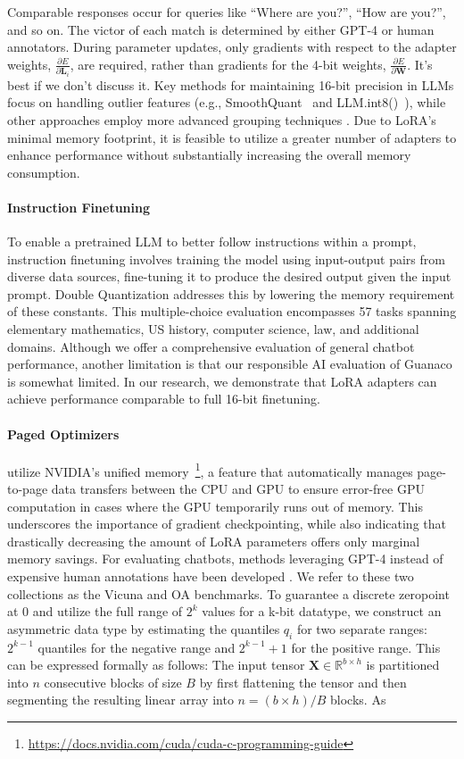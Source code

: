Comparable responses occur for queries like ``Where are you?'', ``How are you?'', and so on. The victor of each match is determined by either GPT-4 or human annotators. During parameter updates, only gradients with respect to the adapter weights, $\frac{\partial E}{\partial \mathbf{L}_i}$, are required, rather than gradients for the 4-bit weights, $\frac{\partial E}{\partial \mathbf{W}}$. It's best if we don't discuss it. Key methods for maintaining 16-bit precision in LLMs focus on handling outlier features (e.g., SmoothQuant~\citep{xiao2022smoothquant} and LLM.int8()~\citep{dettmers2022llm}), while other approaches employ more advanced grouping techniques \citep{park2022nuqmm, yao2022zeroquant}. Due to LoRA's minimal memory footprint, it is feasible to utilize a greater number of adapters to enhance performance without substantially increasing the overall memory consumption. \paragraph{Instruction Finetuning} To enable a pretrained LLM to better follow instructions within a prompt, instruction finetuning involves training the model using input-output pairs from diverse data sources, fine-tuning it to produce the desired output given the input prompt. Double Quantization addresses this by lowering the memory requirement of these constants. This multiple-choice evaluation encompasses 57 tasks spanning elementary mathematics, US history, computer science, law, and additional domains. Although we offer a comprehensive evaluation of general chatbot performance, another limitation is that our responsible AI evaluation of {Guanaco} is somewhat limited. In our research, we demonstrate that LoRA adapters can achieve performance comparable to full 16-bit finetuning. \paragraph{Paged Optimizers} utilize NVIDIA's unified memory~\footnote{\tiny \url{https://docs.nvidia.com/cuda/cuda-c-programming-guide}}, a feature that automatically manages page-to-page data transfers between the CPU and GPU to ensure error-free GPU computation in cases where the GPU temporarily runs out of memory. This underscores the importance of gradient checkpointing, while also indicating that drastically decreasing the amount of LoRA parameters offers only marginal memory savings. For evaluating chatbots, methods leveraging GPT-4 instead of expensive human annotations have been developed \citep{vicuna2023,peng2023instruction}. We refer to these two collections as the Vicuna and OA benchmarks. To guarantee a discrete zeropoint at $0$ and utilize the full range of $2^k$ values for a k-bit datatype, we construct an asymmetric data type by estimating the quantiles $q_i$ for two separate ranges: $2^{k-1}$ quantiles for the negative range and $2^{k-1}+1$ for the positive range. This can be expressed formally as follows: The input tensor $\mathbf{X}\in \mathbb{R}^{b\times h}$ is partitioned into $n$ consecutive blocks of size $B$ by first flattening the tensor and then segmenting the resulting linear array into ${n = ({b\times h})/{B}}$ blocks. As 